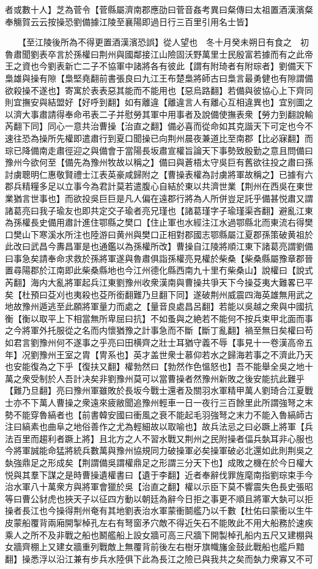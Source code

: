 者或數十人】芝為菅令【菅縣屬濟南郡應劭曰菅音姦考異曰粲傳曰太祖置酒漢濱粲奉觴賀云云按操恐劉備據江陵至襄陽即過日行三百里引用名士皆】

　　【至江陵後所為不得更置酒漢濱恐誤】從人望也　冬十月癸未朔日有食之　初魯肅聞劉表卒言於孫權曰荆州與國鄰接江山險固沃野萬里士民殷富若據而有之此帝王之資也今劉表新亡二子不協軍中諸將各有彼此【謂有附琦者有附琮者】劉備天下梟雄與操有隙【梟堅堯翻前書張良曰九江王布楚梟將師古曰梟言最勇健也有隙謂備欲殺操不遂也】寄寓於表表惡其能而不能用也【惡烏路翻】若備與彼協心上下齊同則宜撫安與結盟好【好呼到翻】如有離違【離違言人有離心互相違異也】宜别圖之以濟大事肅請得奉命弔表二子并慰勞其軍中用事者及說備使撫表衆【勞力到翻說輸芮翻下同】同心一意共治曹操【治直之翻】備必喜而從命如其克諧天下可定也今不速往恐為操所先權即遣肅行到夏口聞操已向荆州晨夜兼道比至南郡【比必寐翻】而琮已降備南走肅徑迎之與備會于當陽長坂肅宣權旨論天下事勢致殷勤之意且問備曰豫州今欲何至【備先為豫州牧故以稱之】備曰與蒼梧太守吳巨有舊欲往投之肅曰孫討虜聰明仁惠敬賢禮士江表英豪咸歸附之【曹操表權為討虜將軍故稱之】已據有六郡兵精糧多足以立事今為君計莫若遣腹心自結於東以共濟世業【荆州在西吳在東世業猶言世事也】而欲投吳巨巨是凡人偏在遠郡行將為人所併豈足託乎備甚悦肅又謂諸葛亮曰我子瑜友也即共定交子瑜者亮兄瑾也【諸葛瑾字子瑜瑾渠吝翻】避亂江東為孫權長史備用肅計進住鄂縣之樊口【住止軍也水經注江水過鄂縣北而東流右得樊口樊山下寒溪水所注也陸游曰黄州與樊口正相對郡國志鄂縣屬江夏郡孫策破黄祖於此改曰武昌今夀昌軍是也通鑑以為孫權所改】曹操自江陵將順江東下諸葛亮謂劉備曰事急矣請奉命求救於孫將軍遂與魯肅俱詣孫權亮見權於柴桑【柴桑縣屬豫章郡晉置尋陽郡於江南即此柴桑縣地也今江州德化縣西南九十里冇柴桑山】說權曰【說式芮翻】海内大亂將軍起兵江東劉豫州收衆漢南與曹操共爭天下今操芟夷大難畧已平矣【杜預曰芟刈也夷殺也芟所銜翻難乃旦翻下同】遂破荆州威震四海英雄無用武之地故豫州遁逃至此願將軍量力而處之【量音良處昌呂翻】若能以吳越之衆與中國抗衡【衡以取平上下相當無所卑屈曰抗】不如蚤與之絶若不能何不按兵束甲北面而事之今將軍外托服從之名而内懷猶豫之計事急而不斷【斷丁亂翻】禍至無日矣權曰苟如君言劉豫州何不遂事之乎亮曰田横齊之壯士耳猶守義不辱【事見十一卷漢高帝五年】况劉豫州王室之胄【冑系也】英才盖世衆士慕仰若水之歸海若事之不濟此乃天也安能復為之下乎【復扶又翻】權勃然曰【勃然作色慍怒也】吾不能舉全吳之地十萬之衆受制於人吾計决矣非劉豫州莫可以當曹操者然豫州新敗之後安能抗此難乎【難乃旦翻】亮曰豫州軍雖敗於長坂今戰士還者及關羽水軍精甲萬人劉琦合江夏戰士亦不下萬人曹操之衆遠來疲敝聞追豫州輕車一日一夜行三百餘里此所謂強弩之末勢不能穿魯縞者也【前書韓安國曰衝風之衰不能起毛羽強弩之末力不能入魯縞師古注曰縞素也曲阜之地俗善作之尤為輕細故以取喻也】故兵法忌之曰必蹶上將軍【兵法百里而趨利者蹶上將】且北方之人不習水戰又荆州之民附操者偪兵埶耳非心服也今將軍誠能命猛將統兵數萬與豫州協規同力破操軍必矣操軍破必北還如此則荆吳之埶強鼎足之形成矣【荆謂備吳謂權鼎足之形謂三分天下也】成敗之機在於今日權大悦與其羣下謀之是時曹操遺權書曰【遺于李翻】近者奉辭伐罪旌麾南指劉琮束手今治水軍八十萬衆方與將軍會獵於吳【治直之翻】權以示臣下莫不響震失色長史張昭等曰曹公豺虎也挾天子以征四方動以朝廷為辭今日拒之事更不順且將軍大埶可以拒操者長江也今操得荆州奄有其地劉表治水軍蒙衝鬬艦乃以千數【杜佑曰蒙衝以生牛皮蒙船覆背兩廂開掣棹孔左右有弩窗矛穴敵不得近矢石不能敗此不用大船務於速疾乘人之所不及非戰之船也鬭艦船上設女牆可高三尺牆下開製棹孔船内五尺又建棚與女牆齊棚上又建女牆重列戰敵上無覆背前後左右樹牙旗幟旛金鼓此戰船也艦戶黯翻】操悉浮以沿江兼有步兵水陸俱下此為長江之險已與我共之矣而埶力衆寡又不可